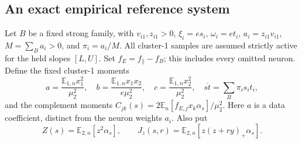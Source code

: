 \documentclass{article} %
\theoremstyle{plain}
\theoremstyle{definition}
\theoremstyle{remark}
\begin{document}
\subsection{An exact empirical reference system}

Let $B$ be a fixed strong family, with $v_{i1},z_{i1}>0$,
$\xi_i=e s_i$, $\omega_i=e t_i$, $a_i=z_{i1}v_{i1}$,
$M=\sum_Ba_i>0$, and $\pi_i=a_i/M$.
All cluster-1 samples are assumed strictly active for the held slopes
$[L,U]$. Set $f_E=f_\parallel-f_B$; this includes every omitted neuron.
Define the fixed cluster-1 moments
\[
 a=\frac{\mathbb E_{1,n}x_1^2}{\mu_2^2},\quad
 b=\frac{\mathbb E_{1,n}x_1x_2}{e\mu_2^2},\quad
 c=\frac{\mathbb E_{1,n}x_2^2}{\mu_2^2},\quad
 \overline{st}=\sum_B\pi_i s_it_i,
\]
and the complement moments
$C_{jk}(s)=2\mathbb E_n[f_{E,j}x_k\alpha_s]/\mu_2^2$.
Here $a$ is a data coefficient, distinct from the neuron weights $a_i$.
Also put
\[
 Z(s)=\mathbb E_{2,n}[z^2\alpha_s],\qquad
 J_z(s,r)=\mathbb E_{2,n}[z(z+ry)_+\alpha_s].
\]
\end{document}
